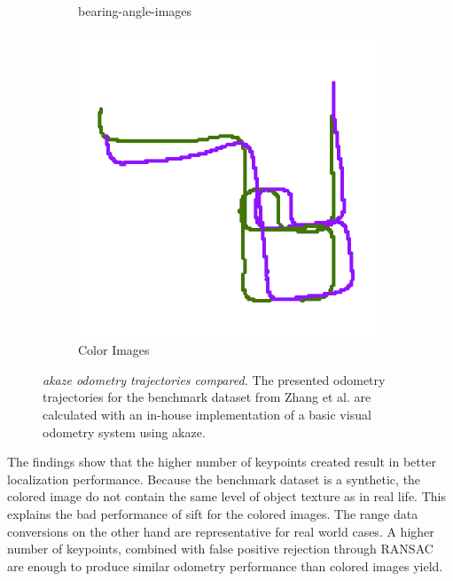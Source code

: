 \begin{figure}[htp]
\begin{subfigure}[b]{0.31\linewidth}
    \caption{\glspl{bearing-angle-image}}
\end{subfigure}%
\begin{subfigure}[b]{0.31\linewidth}
    \includegraphics[width=\linewidth]{chapter06/odo/zhang_pinhole_AKAZE_nice.png}%
    \caption{Color Images}
\end{subfigure}
\caption[\acrshort{akaze} odometry trajectories compared]{\emph{\acrshort{akaze} odometry trajectories compared.} The presented odometry trajectories for the benchmark dataset from Zhang et al.\cite{zhang_icra2016} are calculated with an in-house implementation of a basic visual odometry system using \acrshort{akaze}.}\label{fig:akaze_odometry}
\end{figure}
The findings show that the higher number of keypoints created result in better localization performance.
Because the benchmark dataset is a synthetic, the colored image do not contain the same level of object texture as in real life.
This explains the bad performance of \acrshort{sift} for the colored images.
The range data conversions on the other hand are representative for real world cases.
A higher number of keypoints, combined with false positive rejection through \acrshort{RANSAC} are enough to produce similar odometry performance than colored images yield.

